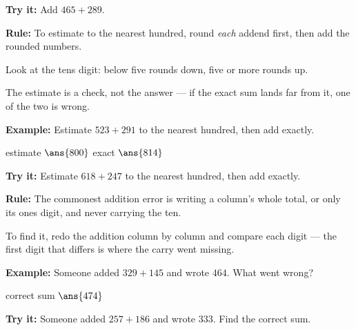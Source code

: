 \documentclass[12pt]{article}
\begin{document}
\begin{tryitbox}
\textbf{Try it:} \quad Add $465 + 289$.\\[2pt]
\end{tryitbox}


\begin{formulabox}
\textbf{Rule:} To estimate to the nearest hundred, round \emph{each} addend first, then add the rounded numbers.\par
Look at the tens digit: below five rounds down, five or more rounds up.\par
The estimate is a check, not the answer --- if the exact sum lands far from it, one of the two is wrong.
\end{formulabox}

\begin{examplebox}
\textbf{Example:} \quad Estimate $523 + 291$ to the nearest hundred, then add exactly.

estimate $\ans{800}$ \qquad exact $\ans{814}$
\end{examplebox}

\begin{tryitbox}
\textbf{Try it:} \quad Estimate $618 + 247$ to the nearest hundred, then add exactly.\\[2pt]
\end{tryitbox}


\begin{formulabox}
\textbf{Rule:} The commonest addition error is writing a column's whole total, or only its ones digit, and never carrying the ten.\par
To find it, redo the addition column by column and compare each digit --- the first digit that differs is where the carry went missing.
\end{formulabox}

\begin{examplebox}
\textbf{Example:} \quad Someone added $329 + 145$ and wrote $464$. What went wrong?

correct sum $\ans{474}$
\end{examplebox}

\begin{tryitbox}
\textbf{Try it:} \quad Someone added $257 + 186$ and wrote $333$. Find the correct sum.\\[2pt]
\end{tryitbox}
\end{document}
